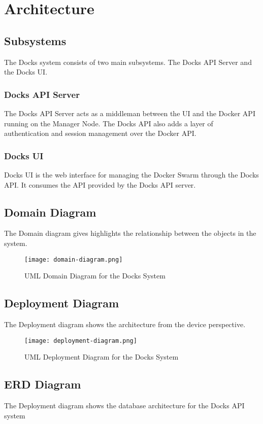 \documentclass[]{article}
\begin{document}
\section{Architecture}
\subsection{Subsystems}
The Docks system consists of two main subsystems. The Docks API Server and the Docks UI.

\subsubsection{Docks API Server}
The Docks API Server acts as a middleman between the UI and the Docker API running on the Manager Node. The Docks API also adds a layer of authentication and session management over the Docker API.

\subsubsection{Docks UI}
Docks UI is the web interface for managing the Docker Swarm through the Docks API. It consumes the API provided by the Docks API server.

\subsection{Domain Diagram}
The Domain diagram gives highlights the relationship between the objects in the system.

\begin{figure}[H]
	\centering
	\texttt{[image: domain-diagram.png]}
	\caption{UML Domain Diagram for the Docks System}
\end{figure}

\subsection{Deployment Diagram}
The Deployment diagram shows the architecture from the device perspective.

\begin{figure}[H]
	\centering
	\texttt{[image: deployment-diagram.png]}
	\caption{UML Deployment Diagram for the Docks System}
\end{figure}

\subsection{ERD Diagram}
The Deployment diagram shows the database architecture for the Docks API system
\end{document}
